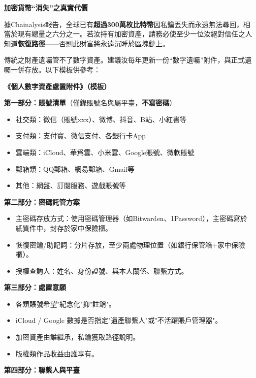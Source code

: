 \textbf{加密貨幣“消失”之真實代價}\par

據Chainalysis報告，全球已有\textbf{超過300萬枚比特幣}因私鑰丟失而永遠無法尋回，相當於現有總量之六分之一。若汝持有加密資產，請務必使至少一位汝絕對信任之人知道\textbf{恢復路徑}——否則此財富將永遠沉睡於區塊鏈上。


傳統之財產遺囑管不了數字資產。建議汝每年更新一份“數字遺囑”附件，與正式遺囑一併存放。以下模板供參考：

\textbf{《個人數字資產處置附件》（模板）}\par

\textbf{第一部分：賬號清單}（僅錄賬號名與屬平臺，\textbf{不寫密碼}）

\begin{itemize}
  \item 社交類：微信（賬號xxx）、微博、抖音、B站、小紅書等
  \item 支付類：支付寶、微信支付、各銀行卡App
  \item 雲端類：iCloud、華爲雲、小米雲、Google賬號、微軟賬號
  \item 郵箱類：QQ郵箱、網易郵箱、Gmail等
  \item 其他：網盤、訂閱服務、遊戲賬號等
\end{itemize}

\textbf{第二部分：密碼託管方案}

\begin{itemize}
  \item 主密碼存放方式：使用密碼管理器（如Bitwarden、1Password），主密碼寫於紙質件中，封存於家中保險櫃。
  \item 恢復密鑰/助記詞：分片存放，至少兩處物理位置（如銀行保管箱+家中保險櫃）。
  \item 授權查詢人：姓名、身份證號、與本人關係、聯繫方式。
\end{itemize}

\textbf{第三部分：處置意願}

\begin{itemize}
  \item 各類賬號希望"紀念化"抑"註銷"。
  \item iCloud / Google 數據是否指定"遺產聯繫人"或"不活躍賬戶管理器"。
  \item 加密資產由誰繼承，私鑰獲取路徑說明。
  \item 版權類作品收益由誰享有。
\end{itemize}

\textbf{第四部分：聯繫人與平臺}

